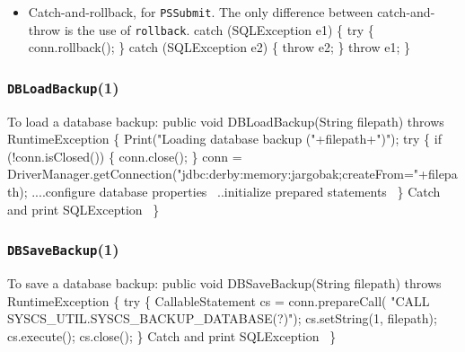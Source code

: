 \documentclass{article}
\def\nwendcode{\endtrivlist \endgroup}
\let\nwdocspar=\par
\theoremstyle{definition}
\begin{document}
\begin{itemize}
\item Catch-and-rollback, for {\tt{}\protect{}PSSubmit}.  The only difference between
catch-and-throw is the use of {\tt{}rollback}.
\nwenddocs{}\endmoddef{}
catch (SQLException e1) \{
  try \{
    conn.rollback();
  \} catch (SQLException e2) \{
    throw e2;
  \}
  throw e1;
\}
\nwendcode{}\nwdocspar
\end{itemize}
\subsubsection{{\tt{}DBLoadBackup}(1)}
\label{sec:load-database-backup}
To load a database backup:
\nwenddocs{}\endmoddef{}
public void DBLoadBackup(String filepath) throws RuntimeException \{
  Print("Loading database backup ("+filepath+")");
  try \{
    if (!conn.isClosed()) \{
      conn.close();
    \}
    conn = DriverManager.getConnection("jdbc:derby:memory:jargobak;createFrom="+filepath);
    \LA{}....configure database properties~{\nwtagstyle{}}\RA{}
    \LA{}..initialize prepared statements~{\nwtagstyle{}}\RA{}
  \}
  \LA{}Catch and print \code{}SQLException\edoc{}~{\nwtagstyle{}}\RA{}
\}
\nwendcode{}\nwdocspar
\subsubsection{{\tt{}DBSaveBackup}(1)}
\label{sec:save-database-backup}
To save a database backup:
\nwenddocs{}\endmoddef{}
public void DBSaveBackup(String filepath) throws RuntimeException \{
  try \{
    CallableStatement cs = conn.prepareCall(
      "CALL SYSCS_UTIL.SYSCS_BACKUP_DATABASE(?)");
    cs.setString(1, filepath);
    cs.execute();
    cs.close();
  \}
  \LA{}Catch and print \code{}SQLException\edoc{}~{\nwtagstyle{}}\RA{}
\}
\nwendcode{}\nwdocspar
\end{document}
